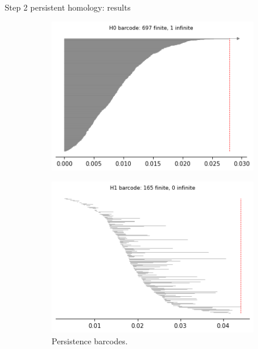 \documentclass[xcolor={dvipsnames,svgnames}]{beamer}
\begin{document}
\begin{frame}{Step 2 persistent homology: results}
\begin{figure}[H]
\begin{subfigure}[b]{0.25\textwidth}
\end{subfigure}
\begin{subfigure}[b]{0.2\textwidth}
    \includegraphics[width=\textwidth]{figures/X2_H0_barcode.png}
    \caption{}
\end{subfigure}
\begin{subfigure}[b]{0.2\textwidth}
    \includegraphics[width=\textwidth]{figures/X2_H1_barcode.png}
        \caption{Persistence barcodes.}
\end{subfigure}
\begin{subfigure}[b]{0.2\textwidth}

\end{subfigure}
\end{figure}
\end{frame}
\end{document}
